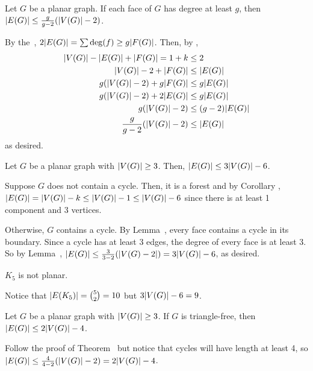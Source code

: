 \begin{lemma}[7.5.2]\label{lem:752}
  Let $G$ be a planar graph. If each face of $G$ has degree at least $g$,
  then $\abs{E(G)} \leq \frac{g}{g-2}(\abs{V(G)}-2)$.
\end{lemma}
\begin{prf}
  By the~, $2\abs{E(G)} = \sum \deg(f) \geq g \abs{F(G)}$.
  Then, by ,
  \begin{align*}
    \abs{V(G)} - \abs{E(G)} + \abs{F(G)} = 1 + k & \leq 2               \\
    \abs{V(G)} - 2 + \abs{F(G)}                  & \leq \abs{E(G)}      \\
    g(\abs{V(G)} - 2) + g\abs{F(G)}              & \leq g\abs{E(G)}     \\
    g(\abs{V(G)} - 2) + 2\abs{E(G)}              & \leq g\abs{E(G)}     \\
    g(\abs{V(G)} - 2)                            & \leq (g-2)\abs{E(G)} \\
    \frac{g}{g-2}(\abs{V(G)} - 2)                & \leq \abs{E(G)}
  \end{align*}
  as desired.
\end{prf}

\begin{theorem}[7.5.3]\label{thm:753}
  Let $G$ be a planar graph with $\abs{V(G)} \geq 3$.
  Then, $\abs{E(G)} \leq 3\abs{V(G)} - 6$.
\end{theorem}
\begin{prf}
  Suppose $G$ does not contain a cycle.
  Then, it is a forest and by Corollary ,
  $\abs{E(G)} = \abs{V(G)} - k \leq \abs{V(G)} - 1 \leq \abs{V(G)} - 6$
  since there is at least 1 component and 3 vertices.

  Otherwise, $G$ contains a cycle.
  By Lemma~, every face contains a cycle in its boundary.
  Since a cycle has at least 3 edges, the degree of every face is at least 3.
  So by Lemma~, $\abs{E(G)} \leq \frac{3}{3-2}(\abs{V(G)-2}) = 3\abs{V(G)} - 6$,
  as desired.
\end{prf}
\begin{corollary}[7.5.4]
  $K_5$ is not planar.
\end{corollary}
\begin{prf}
  Notice that $\abs{E(K_5)} = \binom{5}{2} = 10$ but $3\abs{V(G)} - 6 = 9$.
\end{prf}

\begin{theorem}[7.5.6]
  Let $G$ be a planar graph with $\abs{V(G)} \geq 3$.
  If $G$ is triangle-free, then $\abs{E(G)} \leq 2\abs{V(G)}-4$.
\end{theorem}
\begin{prf}
  Follow the proof of Theorem~
  but notice that cycles will have length at least 4,
  so $\abs{E(G)} \leq \frac{4}{4-2}(\abs{V(G)} - 2) = 2\abs{V(G)} - 4$.
\end{prf}

